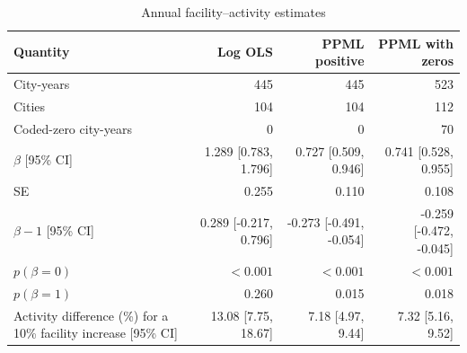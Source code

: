 \begin{table}[htbp]\centering\small\caption{Annual facility--activity estimates}\label{tab:annual_models}
\begin{tabular}{@{}p{43mm}rrr@{}}\toprule
Quantity & Log OLS & PPML positive & PPML with zeros\\
\midrule
City-years & 445 & 445 & 523\\
Cities & 104 & 104 & 112\\
Coded-zero city-years & 0 & 0 & 70\\
$\beta$ [95\% CI] & 1.289 [0.783, 1.796] & 0.727 [0.509, 0.946] & 0.741 [0.528, 0.955]\\
SE & 0.255 & 0.110 & 0.108\\
$\beta-1$ [95\% CI] & 0.289 [-0.217, 0.796] & -0.273 [-0.491, -0.054] & -0.259 [-0.472, -0.045]\\
$p(\beta=0)$ & $<0.001$ & $<0.001$ & $<0.001$\\
$p(\beta=1)$ & 0.260 & 0.015 & 0.018\\
Activity difference (\%) for a 10\% facility increase [95\% CI] & 13.08 [7.75, 18.67] & 7.18 [4.97, 9.44] & 7.32 [5.16, 9.52]\\
\bottomrule\end{tabular}\end{table}
